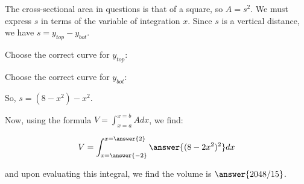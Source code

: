 \documentclass{ximera}
\begin{document}
\begin{exercise}
\begin{exercise}
\begin{exercise}
\begin{exercise}
The cross-sectional area in questions is that of a square, so $A = s^2$.  We must express $s$ in terms of the variable of integration $x$.  Since $s$ is a vertical distance, we have $s=y_{top}-y_{bot}$.

Choose the correct curve for $y_{top}$:
\begin{multipleChoice}
\end{multipleChoice}

Choose the correct curve for $y_{bot}$:
\begin{multipleChoice}
\end{multipleChoice}

So, $s= (8-x^2)-x^2$.
\end{exercise}


\begin{exercise}
Now, using the formula $V= \int_{x=a}^{x=b} A dx$, we find:

\[
 V= \int_{x=\answer{-2}}^{x=\answer{2}} \answer{(8-2x^2)^2} dx
\]

and upon evaluating this integral, we find the volume is $\answer{ 2048/15 }$.
\end{exercise}

\end{exercise}
\end{exercise}
\end{exercise}
\end{document}
